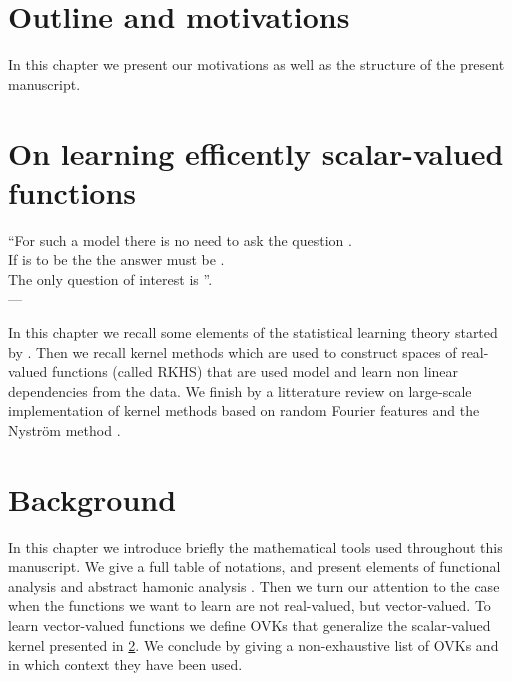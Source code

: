 \chapter{Outline and motivations}
\label{ch:motivations}
\bigskip
\begin{justify}
    In this chapter we present our motivations as well as the structure of the 
    present manuscript.
\end{justify}
\minitoc


\chapter{On learning efficently scalar-valued functions}
\label{ch:motivations}
\bigskip
\begin{flushright}
    ``For such a model there is no need to ask the question . \\
    If  is to be the  the answer must
    be . \\
    The only question of interest is ''. \\
    --- 
    \citep{box1979robustness}
\end{flushright}
\bigskip
\begin{justify}
    In this chapter we recall some elements of the statistical learning theory
    started by \citet{Vapnik1998}.  Then we recall kernel methods
    \citep{Aronszajn1950} which are used to construct spaces of real-valued
    functions (called RKHS) that are used model and learn non linear
    dependencies from the data. We finish by a litterature review on
    large-scale implementation of kernel methods based on random Fourier
    features \citep{Rahimi2007} and the Nystr\"om method
    \citep{Williams2000-nystrom}.
\end{justify}
\minitoc


\chapter{Background}
\label{ch:background}
\bigskip
\begin{justify}
    In this chapter we introduce briefly the mathematical tools used throughout
    this manuscript. We give a full table of notations, and present elements of
    functional analysis \citep{kurdila2006convex} and abstract hamonic analysis
    \citep{folland1994course}. Then we turn our attention to the case when the
    functions we want to learn are not real-valued, but vector-valued.  To
    learn vector-valued functions we define \aclp{OVK} that generalize the
    scalar-valued kernel presented in \cref{ch:motivations}. We conclude by
    giving a non-exhaustive list of \aclp{OVK} and in which context they have
    been used.
\end{justify}
\minitoc

